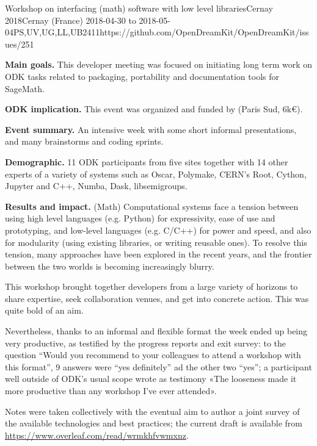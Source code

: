 \begin{event}{Workshop on interfacing (math) software with low level libraries}{Cernay 2018}{Cernay (France) 2018-04-30 to 2018-05-04}{PS,UV,UG,LL,UB}{24}{11}{https://github.com/OpenDreamKit/OpenDreamKit/issues/251}

  \textbf{Main goals.} This developer meeting was focused on
  initiating long term work on ODK tasks related to packaging,
  portability and documentation tools for SageMath.

  \textbf{ODK implication.} This event was organized and funded by
  \ODK (Paris Sud, \approx 6k€).

  \textbf{Event summary.} An intensive week with some short informal
  presentations, and many brainstorms and coding sprints.

  \textbf{Demographic.} 11 ODK participants from five sites together
  with 14 other experts of a variety of systems such as Oscar,
  Polymake, CERN's Root, Cython, Jupyter and C++, Numba, Dask,
  libsemigroups.

  \textbf{Results and impact.} (Math) Computational systems face a
  tension between using high level languages (e.g. Python) for
  expressivity, ease of use and prototyping, and low-level languages
  (e.g. C/C++) for power and speed, and also for modularity (using
  existing libraries, or writing reusable ones). To resolve this
  tension, many approaches have been explored in the recent years, and
  the frontier between the two worlds is becoming increasingly blurry.

  This workshop brought together developers from a large variety of
  horizons to share expertise, seek collaboration venues, and get into
  concrete action. This was quite bold of an aim.

  Nevertheless, thanks to an informal and flexible format the week
  ended up being very productive, as testified by the progress reports
  and exit survey: to the question “Would you recommend to your
  colleagues to attend a workshop with this format”, 9 answers were
  ``yes definitely'' ad the other two ``yes''; a participant well
  outside of ODK's usual scope wrote as testimony «The looseness made
  it more productive than any workshop I've ever attended».

  Notes were taken collectively with the eventual aim to author a
  joint survey of the available technologies and best practices; the
  current draft is available from
  \url{https://www.overleaf.com/read/wrmkhfvwmxnz}.


\end{event}
